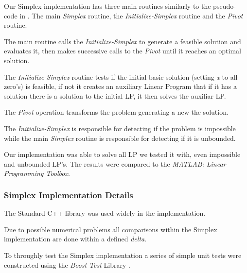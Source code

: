 Our Simplex implementation has three main routines similarly to the pseudo-code in \cite{Cormen}. The main \emph{Simplex} routine, the \emph{Initialize-Simplex} routine and the \emph{Pivot} routine.

The main routine calls the \emph{Initialize-Simplex} to generate a feasible solution and evaluates it, then makes successive calls to the \emph{Pivot} until it reaches an optimal solution.

The \emph{Initialize-Simplex} routine tests if the initial basic solution (setting \emph{x} to all zero's) is feasible, if not it creates an auxiliary Linear Program that if it has a solution there is a solution to the initial LP, it then solves the auxiliar LP.

The \emph{Pivot} operation transforms the problem generating a new the solution.

The \emph{Initialize-Simplex} is responsible for detecting if the problem is impossible while the main \emph{Simplex} routine is responsible for detecting if it is unbounded.

Our implementation was able to solve all LP we tested it with, even impossible and unbounded LP's. The results were compared to the \emph{MATLAB: Linear Programming Toolbox}.

\subsubsection{Simplex Implementation Details}
\label{subs:SimplexImplementationDetails}

The Standard C++ library was used widely in the implementation. %

Due to possible numerical problems all comparisons within the Simplex implementation are done within a defined \emph{delta}.

To throughly test the Simplex implementation a series of simple unit tests were constructed using the \emph{Boost Test} Library \cite{BoostSite}.
